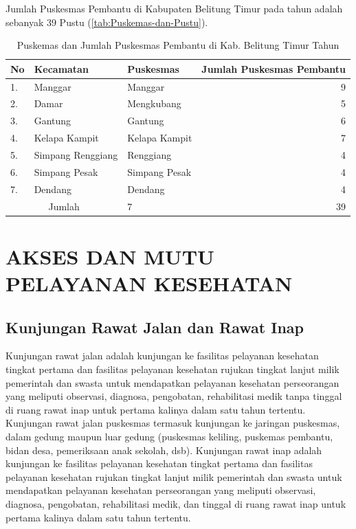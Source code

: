 Jumlah Puskesmas Pembantu di Kabupaten Belitung Timur pada tahun \tP adalah sebanyak 39 Pustu (\autoref{tab:Puskemas-dan-Pustu}).

\begin{table}[!ht]
\caption{Puskemas dan Jumlah Puskesmas Pembantu di Kab. Belitung Timur Tahun \tP}
\label{tab:Puskemas-dan-Pustu}
\centering{}%

\begin{tabular}{lllr}
	\toprule
	No                    & Kecamatan         & Puskesmas     & Jumlah Puskesmas Pembantu \\
	\midrule
	1.                    & Manggar           & Manggar       &                         9 \\
	\rowcolor{black!10}2. & Damar             & Mengkubang    &                         5 \\
	3.                    & Gantung           & Gantung       &                         6 \\
	\rowcolor{black!10}4. & Kelapa Kampit     & Kelapa Kampit &                         7 \\
	5.                    & Simpang Renggiang & Renggiang     &                         4 \\
	\rowcolor{black!10}6. & Simpang Pesak     & Simpang Pesak &                         4 \\
	7.                    & Dendang           & Dendang       &                         4 \\
	\midrule
	       \multicolumn{2}{c}{Jumlah}         & 7             &                        39 \\
	\bottomrule
\end{tabular}
\end{table}

\section{AKSES DAN MUTU PELAYANAN KESEHATAN}
\subsection{Kunjungan Rawat Jalan dan Rawat Inap}
Kunjungan rawat jalan adalah kunjungan ke fasilitas pelayanan kesehatan tingkat pertama dan fasilitas pelayanan kesehatan rujukan tingkat lanjut milik pemerintah dan swasta untuk mendapatkan pelayanan kesehatan perseorangan yang meliputi observasi, diagnosa, pengobatan, rehabilitasi medik tanpa tinggal di ruang rawat inap untuk pertama kalinya dalam satu tahun tertentu. Kunjungan rawat jalan puskesmas termasuk kunjungan ke jaringan puskesmas, dalam gedung maupun luar gedung (puskesmas keliling, puskemas pembantu, bidan desa, pemeriksaan anak sekolah, dsb).
Kunjungan rawat inap adalah kunjungan ke fasilitas pelayanan kesehatan tingkat pertama dan fasilitas pelayanan kesehatan rujukan tingkat lanjut milik pemerintah dan swasta untuk mendapatkan pelayanan kesehatan perseorangan yang meliputi observasi, diagnosa, pengobatan, rehabilitasi medik, dan tinggal di ruang rawat inap untuk pertama kalinya dalam satu tahun tertentu.

